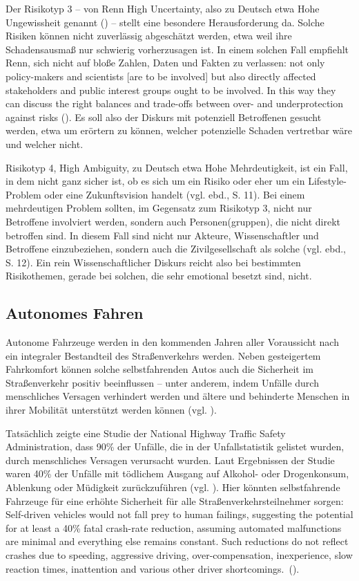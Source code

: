 Der Risikotyp 3 -- von Renn \glqq High Uncertainty\grqq , also zu Deutsch etwa \glq Hohe Ungewissheit\grq{} genannt (\cite[10]{renn2015stakeholder}) -- stellt eine besondere Herausforderung da. Solche Risiken können nicht zuverlässig abgeschätzt werden, etwa weil ihre Schadensausmaß nur schwierig vorherzusagen ist. In einem solchen Fall empfiehlt Renn, sich nicht auf bloße Zahlen, Daten und Fakten zu verlassen: \glqq not only policy-makers and scientists [are to be involved] but also directly affected stakeholders and public interest groups ought to be involved. In this way they can discuss the \glq right\grq{} balances and trade-offs between over- and underprotection against risks\grqq{} (\cite[10f.]{renn2015stakeholder}). Es soll also der Diskurs mit potenziell Betroffenen gesucht werden, etwa um erörtern zu können, welcher potenzielle Schaden vertretbar wäre und welcher nicht.

Risikotyp 4, \glqq High Ambiguity\grqq , zu Deutsch etwa \glq Hohe Mehrdeutigkeit\grq , ist ein Fall, in dem nicht ganz sicher ist, ob es sich um ein Risiko oder eher um ein Lifestyle-Problem oder eine Zukunftsvision handelt (vgl. ebd., S. 11). Bei einem mehrdeutigen Problem sollten, im Gegensatz zum Risikotyp 3, nicht nur Betroffene involviert werden, sondern auch Personen(gruppen), die nicht direkt betroffen sind. In diesem Fall sind nicht nur Akteure, Wissenschaftler und Betroffene einzubeziehen, sondern auch die \glq Zivilgesellschaft\grq{} als solche (vgl. ebd., S. 12). Ein rein \glq Wissenschaftlicher Diskurs\grq{} reicht also bei bestimmten Risikothemen, gerade bei solchen, die sehr emotional besetzt sind, nicht.

\subsection{Autonomes Fahren}

Autonome Fahrzeuge werden in den kommenden Jahren aller Voraussicht nach ein integraler Bestandteil des Straßenverkehrs werden. Neben gesteigertem Fahrkomfort können solche selbstfahrenden Autos auch die Sicherheit im Straßenverkehr positiv beeinflussen – unter anderem, indem Unfälle durch menschliches Versagen verhindert werden und ältere und behinderte Menschen in ihrer Mobilität unterstützt werden können (vgl.  \cite[167]{fagnant2015preparing}).

Tatsächlich zeigte eine Studie der National Highway Traffic Safety Administration, dass 90\% der Unfälle, die in der Unfallstatistik gelistet wurden, durch menschliches Versagen verursacht wurden. Laut Ergebnissen der Studie waren 40\% der Unfälle mit tödlichem Ausgang auf Alkohol- oder Drogenkonsum, Ablenkung oder Müdigkeit zurückzuführen (vgl. \cite{singh2015critical}). Hier könnten selbstfahrende Fahrzeuge für eine erhöhte Sicherheit für alle Straßenverkehrsteilnehmer sorgen: \glqq Self-driven vehicles would not fall prey to human failings, suggesting the potential for at least a 40\% fatal crash-rate reduction, assuming automated malfunctions are minimal and everything else remains constant. Such reductions do not reflect crashes due to speeding, aggressive driving, over-compensation, inexperience, slow reaction times, inattention and various other driver shortcomings.\grqq \ (\cite[169]{fagnant2015preparing}).

